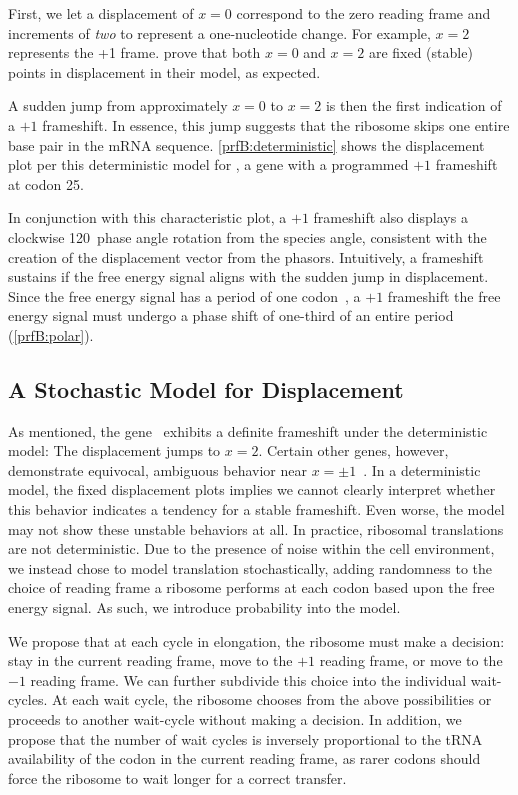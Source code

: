 \documentclass[12pt]{article}
\numberwithin{equation}{section}
\begin{document}
First, we let a displacement of $x = 0$ correspond to the zero reading frame and increments of
\emph{two} to represent a one-nucleotide change. For example, $x =2$ represents the +1 frame.
\citet{lalit:embs} prove that both $x = 0$ and $x = 2$ are fixed (stable) points in displacement in their model,
as expected.

A sudden jump from approximately $x = 0$ to $x = 2$ is then the first indication of a $+1$ frameshift.
In essence, this jump suggests that the ribosome skips one entire base pair in the mRNA sequence.
\autoref{prfB:deterministic} shows the displacement plot per this deterministic model for \prfB, 
a gene with a programmed $+1$ frameshift at codon 25.

In conjunction with this characteristic plot, a $+1$ frameshift also displays a clockwise 120\degree\
phase angle rotation from the species angle, consistent with the
creation of the displacement vector from the phasors.
Intuitively, a frameshift sustains if the free energy signal aligns with the sudden jump in displacement.
Since the free energy signal has a period of one codon~\cite{lalit:mechanics}, a $+1$ frameshift the free energy signal
must undergo a phase shift of one-third of an entire period (\autoref{prfB:polar}).

\subsection{A Stochastic Model for Displacement}
\label{stochastic}

As mentioned, the gene \prfB\ exhibits a definite frameshift under the
deterministic model: The displacement jumps to $x=2$.  Certain other
genes, however, demonstrate equivocal, ambiguous behavior near $x = \pm
1$~\cite{lalit:embs}.  In a deterministic model, the fixed
displacement plots implies we cannot clearly interpret whether this
behavior indicates a tendency for a stable frameshift. Even worse,
the model may not show these unstable behaviors at all. In practice,
ribosomal translations are not deterministic. Due to the presence of
noise within the cell environment, we instead chose to model
translation stochastically, adding randomness to the choice of reading
frame a ribosome performs at each codon based upon the free energy signal.
As such, we introduce probability into the model.

We propose that at each cycle in elongation, the ribosome must make a
decision: stay in the current reading frame, move to the $+1$ reading
frame, or move to the $-1$ reading frame.  We can further subdivide
this choice into the individual wait-cycles.  At each wait cycle, the
ribosome chooses from the above possibilities or proceeds to another
wait-cycle without making a decision.  In addition, we propose that the 
number of wait cycles is inversely proportional to the tRNA availability of 
the codon in the current reading frame, as rarer codons should force the 
ribosome to wait longer for a correct transfer.
\end{document}
